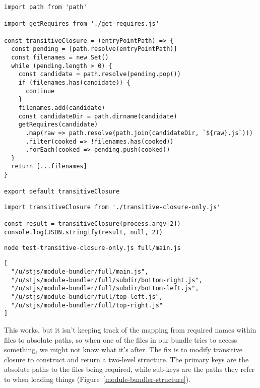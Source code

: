 \documentclass[krantzl]{krantz}
\newcommand{\figref}[1]{Figure~\ref{#1}}
\begin{document}
\begin{lstlisting}[frame=tblr]
import path from 'path'

import getRequires from './get-requires.js'

const transitiveClosure = (entryPointPath) => {
  const pending = [path.resolve(entryPointPath)]
  const filenames = new Set()
  while (pending.length > 0) {
    const candidate = path.resolve(pending.pop())
    if (filenames.has(candidate)) {
      continue
    }
    filenames.add(candidate)
    const candidateDir = path.dirname(candidate)
    getRequires(candidate)
      .map(raw => path.resolve(path.join(candidateDir, `${raw}.js`)))
      .filter(cooked => !filenames.has(cooked))
      .forEach(cooked => pending.push(cooked))
  }
  return [...filenames]
}

export default transitiveClosure
\end{lstlisting}



\begin{lstlisting}[frame=tblr]
import transitiveClosure from './transitive-closure-only.js'

const result = transitiveClosure(process.argv[2])
console.log(JSON.stringify(result, null, 2))
\end{lstlisting}



\begin{lstlisting}[frame=shadowbox]
node test-transitive-closure-only.js full/main.js
\end{lstlisting}



\begin{lstlisting}[frame=tblr,backgroundcolor=\color{black!5}]
[
  "/u/stjs/module-bundler/full/main.js",
  "/u/stjs/module-bundler/full/subdir/bottom-right.js",
  "/u/stjs/module-bundler/full/subdir/bottom-left.js",
  "/u/stjs/module-bundler/full/top-left.js",
  "/u/stjs/module-bundler/full/top-right.js"
]
\end{lstlisting}



This works,
but it isn’t keeping track of the mapping from required names within files to absolute paths,
so when one of the files in our bundle tries to access something,
we might not know what it’s after.
The fix is to modify transitive closure to construct and return a two-level structure.
The primary keys are the absolute paths to the files being required,
while sub-keys are the paths they refer to when loading things
(\figref{module-bundler-structure}).
\end{document}
